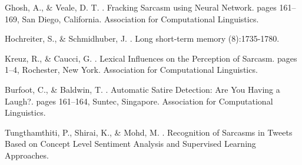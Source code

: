 \documentclass[11pt]{article}
\begin{document}
%
%

\begin{thebibliography}{}

Ghosh, A., \& Veale, D. T.
.
\newblock Fracking Sarcasm using Neural Network.
\newblock pages 161–169, San Diego, California. Association for Computational Linguistics.

Hochreiter, S., \& Schmidhuber, J.
.
\newblock Long short-term memory
(8):1735-1780.

Kreuz, R., \& Caucci, G.
.
\newblock Lexical Influences on the Perception of Sarcasm.
\newblock pages 1–4, Rochester, New York. Association for Computational Linguistics.

Burfoot, C., \& Baldwin, T.
.
\newblock Automatic Satire Detection: Are You Having a Laugh?.
\newblock pages 161–164, Suntec, Singapore. Association for Computational Linguistics.

Tungthamthiti, P., Shirai, K., \& Mohd, M.
.
\newblock Recognition of Sarcasms in Tweets Based on Concept Level Sentiment Analysis and Supervised Learning Approaches.

\end{thebibliography}
\end{document}
